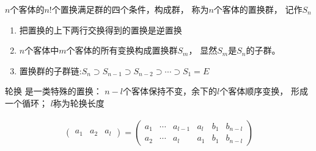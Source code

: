 \begin{newprop}[置换群]
$n$个客体的$n!$个置换满足群的四个条件，构成群，
称为{\color{seco}$n$个客体的置换群}，
记作{\color{seco}$S_n$}
\end{newprop}

\begin{note}
\begin{enumerate}
	
	\item 把置换的上下两行交换得到的置换是逆置换
		
	\item $n$个客体中$m$个客体的所有变换构成置换群$S_m$，
	显然$S_m$是$S_n$的子群。
	
	\item 置换群的子群链:$S_n\supset S_{n-1}\supset S_{n-2}\supset \cdots \supset S_1=E$
\end{enumerate}
\end{note}

\begin{newdef}[轮换]
{\color{seco}轮换} 是一类特殊的置换：
$n-l$个客体保持不变，余下的$l$个客体顺序变换，
形成一个循环；
$l$称为{\color{seco}轮换长度}
\end{newdef}

\begin{example}[轮换]
	\begin{equation}\begin{aligned}
	\begin{pmatrix}
	a_1&a_2&a_l
	\end{pmatrix}=
	\begin{pmatrix}
	a_1&\cdots&a_{l-1}&a_{l}&b_{1}&b_{n-l}\\
	a_2&\cdots&a_{l}&a_{1}&b_{1}&b_{n-l}
	\end{pmatrix}
	\end{aligned}\end{equation}
\end{example}

